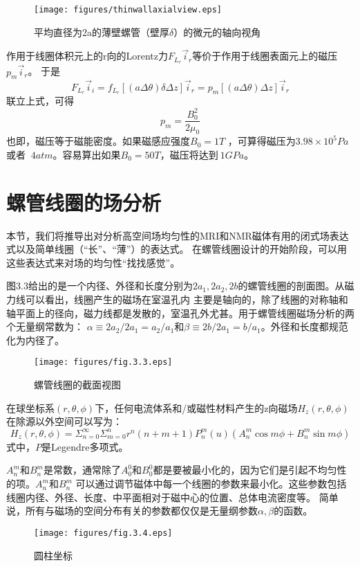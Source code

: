 \begin{figure}[htbp]
  \centering
 \texttt{[image: figures/thinwallaxialview.eps]}
  \caption{平均直径为2a的薄壁螺管（壁厚$\delta$）的微元的轴向视角}
\end{figure}
作用于线圈体积元上的r向的Lorentz力$F_{L_r}\vec{i}_r$等价于作用于线圈表面元上的磁压$p_m\vec{i}_r$。
于是
\begin{equation}\label{eqn:inf solenoid fl2}
  F_{L_r}\vec{i}_i =f_{L_r}[(a\Delta \theta)\delta \Delta z]\vec{i}_r=p_m[(a\Delta \theta)\Delta z]\vec{i}_r
\end{equation}
联立上式，可得
\begin{equation}\label{eqn:mag press}
  p_m=\frac{B_0^2}{2\mu_0}
\end{equation}
也即，磁压等于磁能密度。如果磁感应强度$B_0=1 T$ ，可算得磁压为$3.98\times 10^5 Pa$或者
$~4 atm$。容易算出如果$B_0=50 T$，磁压将达到$~1 GPa$。

\section{螺管线圈的场分析}
本节，我们将推导出对分析高空间场均匀性的MRI和NMR磁体有用的闭式场表达式以及简单线圈（“长”、“薄”）的表达式。
在螺管线圈设计的开始阶段，可以用这些表达式来对场的均匀性“找找感觉”。

图3.3给出的是一个内径、外径和长度分别为$2a_1, 2a_2, 2b$的螺管线圈的剖面图。从磁力线可以看出，线圈产生的磁场在室温孔内
主要是轴向的，除了线圈的对称轴和轴平面上的径向，磁力线都是发散的，室温孔外尤甚。用于螺管线圈磁场分析的两个无量纲常数为：
$\alpha\equiv 2a_2/2a_1=a_2/a_1$和$\beta\equiv 2b/2a_1=b/a_1$。外径和长度都规范化为内径了。
\begin{figure}[htbp]
	\centering
	\texttt{[image: figures/fig.3.3.eps]}
	\caption{螺管线圈的截面视图}
\end{figure}

在球坐标系$(r,\theta,\phi)$下，任何电流体系和/或磁性材料产生的z向磁场$H_z(r,\theta,\phi)$在除源以外空间可以写为：
\begin{equation}\label{eqn:solenoid coil hz}
  H_z (r,\theta,\phi)=\Sigma_{n=0}^\infty \Sigma_{m=0}^n r^n (n+m+1) P_n^m(u)(A_n^m\cos m\phi+B_n^m\sin m\phi)
\end{equation}
式中，$P$是Legendre多项式。

$A_n^m$和$B_n^m$是常数，通常除了$A_0^0$和$B_0^0$都是要被最小化的，因为它们是引起不均匀性的项。$A_n^m$和$B_n^m$
可以通过调节磁体中每一个线圈的参数来最小化。这些参数包括线圈内径、外径、长度、中平面相对于磁中心的位置、总体电流密度等。
简单说，所有与磁场的空间分布有关的参数都仅仅是无量纲参数$\alpha, \beta$的函数。
\begin{figure}[htbp]
	\centering
	\texttt{[image: figures/fig.3.4.eps]}
	\caption{圆柱坐标}
\end{figure}

